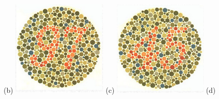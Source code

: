 \documentclass[	12pt, Times, openright, twoside, a4paper, english, brazil]{abntex2}
\begin{document}
\begin{apendicesenv}
\begin{figure}[!htb]
(b)
\endminipage\hfill
{}
\centering
{\includegraphics[width=\linewidth]{ishihara-fuga/figureIshihara12.png}}
(c)
\endminipage\hfill
{}
\centering
{\includegraphics[width=\linewidth]{ishihara-fuga/figureIshihara13.png}}
(d)
\endminipage\hfill


\end{figure}
\end{apendicesenv}
\end{document}
